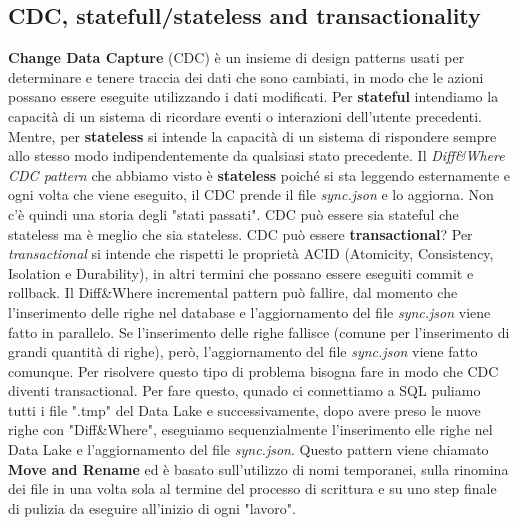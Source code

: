 \documentclass{article}
\begin{document}
\subsection{CDC, statefull/stateless and transactionality}
\textbf{Change Data Capture} (CDC) è un insieme di design patterns usati per determinare e tenere traccia dei dati che sono cambiati, in modo che le azioni possano essere eseguite utilizzando i dati modificati.
\newline Per \textbf{stateful} intendiamo la capacità di un sistema di ricordare eventi o interazioni dell'utente precedenti. Mentre, per \textbf{stateless} si intende la capacità di un sistema di rispondere sempre allo stesso modo indipendentemente da qualsiasi stato precedente.
\newline Il \textit{Diff\&Where CDC pattern} che abbiamo visto è \textbf{stateless} poiché si sta leggendo esternamente e ogni volta che viene eseguito, il CDC prende il file \textit{sync.json} e lo aggiorna. Non c'è quindi una storia degli "stati passati". CDC può essere sia stateful che stateless ma è meglio che sia stateless. 
\newline CDC può essere \textbf{transactional}? Per \textit{transactional} si intende che rispetti le proprietà ACID (Atomicity, Consistency, Isolation e Durability), in altri termini che possano essere eseguiti commit e rollback. 
Il Diff\&Where incremental pattern può fallire, dal momento che l'inserimento delle righe nel database e l'aggiornamento del file \textit{sync.json} viene fatto in parallelo. Se l'inserimento delle righe fallisce (comune per l'inserimento di grandi quantità di righe), però, l'aggiornamento del file \textit{sync.json} viene fatto comunque.
Per risolvere questo tipo di problema bisogna fare in modo che CDC diventi transactional. Per fare questo, qunado ci connettiamo a SQL puliamo tutti i file ".tmp" del Data Lake e successivamente, dopo avere preso le nuove righe con "Diff\&Where", eseguiamo sequenzialmente l'inserimento elle righe nel Data Lake e l'aggiornamento del file \textit{sync.json}. Questo pattern viene chiamato \textbf{Move and Rename} ed è basato sull'utilizzo di nomi temporanei, sulla rinomina dei file in una volta sola al termine del processo di scrittura e su uno step finale di pulizia da eseguire all'inizio di ogni "lavoro".
\end{document}
